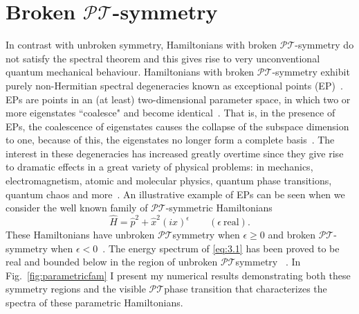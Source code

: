 \documentclass[12pt, a4paper]{report}
\newcommand\PT{\(\mathcal{PT}\)}
\begin{document}
\chapter{Broken \PT-symmetry}\label{EPs}
In contrast with unbroken symmetry, Hamiltonians with broken \PT-symmetry do not satisfy the spectral theorem and this gives rise to very unconventional quantum mechanical behaviour. Hamiltonians with broken \PT-symmetry exhibit purely non-Hermitian spectral degeneracies known as exceptional points (EP)~\cite{Bossart}.
EPs are points in an (at least) two-dimensional parameter space, in which two or more eigenstates ``coalesce" and become identical~\cite{Moiseyev, Cartarius}. That is, in the presence of EPs, the coalescence of eigenstates causes the collapse of the subspace dimension to one, because of this, the eigenstates no longer form a complete basis~\cite{Bagarello}. The interest in these degeneracies has increased greatly overtime since they give rise to dramatic effects in a great variety of physical problems: in mechanics, electromagnetism, atomic and molecular physics, quantum phase transitions, quantum chaos and more~\cite{Heiss_2012}.
An illustrative example of EPs can be seen when we consider the well known family of \PT-symmetric Hamiltonians
\begin{equation}\label{eq:3.1}
\hat{H} = \hat{p}^2 + \hat{x}^{2}(i x)^{\epsilon} \quad\quad (\epsilon\:\mathrm{real}). 
\end{equation}
These Hamiltonians have unbroken \PT\:symmetry when $\epsilon \geq 0$ and broken \PT-symmetry when $\epsilon < 0$~\cite{MakingSense}. The energy spectrum of \ref{eq:3.1} has been proved to be real and bounded below in the region of unbroken \PT\:symmetry ~\cite{Dorey_2004}. In Fig.~\ref{fig:parametricfam} I present my numerical results demonstrating both these symmetry regions and the visible \PT\:phase transition that characterizes the spectra of these parametric Hamiltonians.
\end{document}
